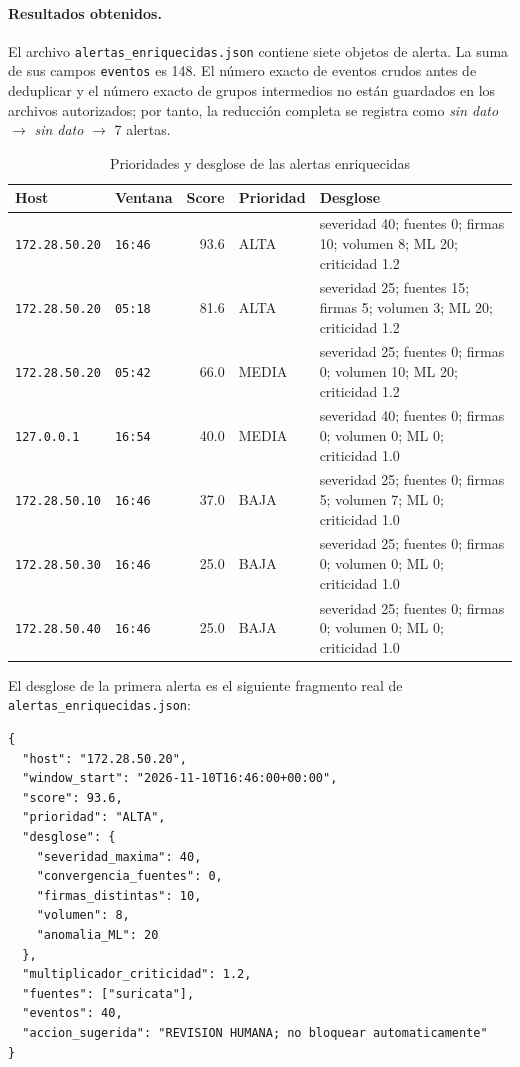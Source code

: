 \paragraph{Resultados obtenidos.}
El archivo \texttt{alertas\_enriquecidas.json} contiene siete objetos de alerta. La suma de sus campos \texttt{eventos} es 148. El número exacto de eventos crudos antes de deduplicar y el número exacto de grupos intermedios no están guardados en los archivos autorizados; por tanto, la reducción completa se registra como \emph{sin dato} $\rightarrow$ \emph{sin dato} $\rightarrow$ 7 alertas.

\begin{table}[H]
\caption{Prioridades y desglose de las alertas enriquecidas}
\label{tab:c9_prioridades}
\centering
\footnotesize
\renewcommand{\arraystretch}{1.18}
\begin{tabularx}{\textwidth}{@{}l l r l X@{}}
\toprule
\textbf{Host} & \textbf{Ventana} & \textbf{Score} & \textbf{Prioridad} & \textbf{Desglose} \\
\midrule
\texttt{172.28.50.20} & \texttt{16:46} & 93.6 & ALTA & severidad 40; fuentes 0; firmas 10; volumen 8; ML 20; criticidad 1.2 \\
\texttt{172.28.50.20} & \texttt{05:18} & 81.6 & ALTA & severidad 25; fuentes 15; firmas 5; volumen 3; ML 20; criticidad 1.2 \\
\texttt{172.28.50.20} & \texttt{05:42} & 66.0 & MEDIA & severidad 25; fuentes 0; firmas 0; volumen 10; ML 20; criticidad 1.2 \\
\texttt{127.0.0.1} & \texttt{16:54} & 40.0 & MEDIA & severidad 40; fuentes 0; firmas 0; volumen 0; ML 0; criticidad 1.0 \\
\texttt{172.28.50.10} & \texttt{16:46} & 37.0 & BAJA & severidad 25; fuentes 0; firmas 5; volumen 7; ML 0; criticidad 1.0 \\
\texttt{172.28.50.30} & \texttt{16:46} & 25.0 & BAJA & severidad 25; fuentes 0; firmas 0; volumen 0; ML 0; criticidad 1.0 \\
\texttt{172.28.50.40} & \texttt{16:46} & 25.0 & BAJA & severidad 25; fuentes 0; firmas 0; volumen 0; ML 0; criticidad 1.0 \\
\bottomrule
\end{tabularx}
\end{table}

El desglose de la primera alerta es el siguiente fragmento real de \texttt{alertas\_enriquecidas.json}:

\begin{verbatim}
{
  "host": "172.28.50.20",
  "window_start": "2026-11-10T16:46:00+00:00",
  "score": 93.6,
  "prioridad": "ALTA",
  "desglose": {
    "severidad_maxima": 40,
    "convergencia_fuentes": 0,
    "firmas_distintas": 10,
    "volumen": 8,
    "anomalia_ML": 20
  },
  "multiplicador_criticidad": 1.2,
  "fuentes": ["suricata"],
  "eventos": 40,
  "accion_sugerida": "REVISION HUMANA; no bloquear automaticamente"
}
\end{verbatim}

